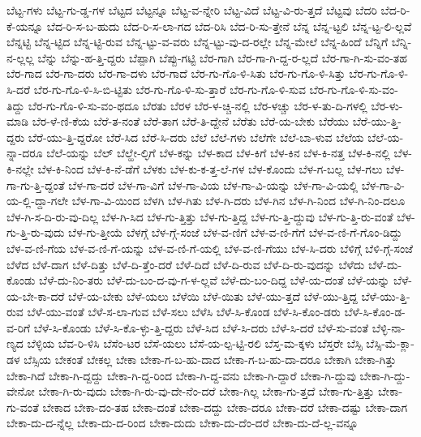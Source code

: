 {ಬೆಟ್ಟ-ಗಳು
ಬೆಟ್ಟ-ಗು-ಡ್ಡ-ಗಳ
ಬೆಟ್ಟದ
ಬೆಟ್ಟನ್ನೂ
ಬೆಟ್ಟ-ವ-ನ್ನೇರಿ
ಬೆಟ್ಟ-ವಿದೆ
ಬೆಟ್ಟ-ವಿ-ರು-ತ್ತದೆ
ಬೆಟ್ಟವು
ಬೆದರಿ
ಬೆದ-ರಿ-ಕೆ-ಯನ್ನೂ
ಬೆದ-ರಿ-ಸ-ಬ-ಹುದು
ಬೆದ-ರಿ-ಸ-ಲಾ-ಗದ
ಬೆದ-ರಿಸಿ
ಬೆದ-ರಿ-ಸು-ತ್ತೇನೆ
ಬೆನ್ನ
ಬೆನ್ನ-ಟ್ಟಲಿ
ಬೆನ್ನ-ಟ್ಟ-ಲಿ-ಲ್ಲವೆ
ಬೆನ್ನಟ್ಟಿ
ಬೆನ್ನ-ಟ್ಟಿದ
ಬೆನ್ನ-ಟ್ಟಿ-ರುವ
ಬೆನ್ನ-ಟ್ಟು-ವ-ವರು
ಬೆನ್ನ-ಟ್ಟು-ವು-ದ-ರಲ್ಲೇ
ಬೆನ್ನ-ಮೇಲೆ
ಬೆನ್ನ-ಹಿಂದೆ
ಬೆನ್ನಿಗೆ
ಬೆನ್ನಿ-ನ-ಲ್ಲಲ್ಲ
ಬೆನ್ನು
ಬೆನ್ನು-ಹ-ತ್ತಿ-ದ್ದರು
ಬೆಪ್ಪಾಗಿ
ಬೆಪ್ಪು-ಗಟ್ಟಿ
ಬೆರ-ಗಾಗಿ
ಬೆರ-ಗಾ-ಗಿ-ದ್ದ-ರ-ಲ್ಲದೆ
ಬೆರ-ಗಾ-ಗಿ-ಸು-ವಂ-ತಹ
ಬೆರ-ಗಾದ
ಬೆರ-ಗಾ-ದರು
ಬೆರ-ಗಾ-ದಳು
ಬೆರ-ಗಾದೆ
ಬೆರ-ಗು-ಗೊ-ಳಿ-ಸಿತು
ಬೆರ-ಗು-ಗೊ-ಳಿ-ಸಿತ್ತು
ಬೆರ-ಗು-ಗೊ-ಳಿ-ಸಿ-ದರೆ
ಬೆರ-ಗು-ಗೊ-ಳಿ-ಸಿ-ಬಿ-ಟ್ಟಿತು
ಬೆರ-ಗು-ಗೊ-ಳಿ-ಸು-ತ್ತಾರೆ
ಬೆರ-ಗು-ಗೊ-ಳಿ-ಸುವ
ಬೆರ-ಗು-ಗೊ-ಳಿ-ಸು-ವಂ-ತಿದ್ದು
ಬೆರ-ಗು-ಗೊ-ಳಿ-ಸು-ವಂ-ಥದೂ
ಬೆರತು
ಬೆರಳ
ಬೆರ-ಳ-ಚ್ಚಿ-ನಲ್ಲಿ
ಬೆರ-ಳಚ್ಚು
ಬೆರ-ಳ-ತು-ದಿ-ಗಳಲ್ಲಿ
ಬೆರ-ಳು-ಮಾಡಿ
ಬೆರ-ಳೆ-ಣಿ-ಕೆಯ
ಬೆರೆ-ತ-ನಂತೆ
ಬೆರೆ-ತಾಗ
ಬೆರೆ-ತಿ-ದ್ದೇನೆ
ಬೆರೆತು
ಬೆರೆ-ಯ-ಬೇಕು
ಬೆರೆಯು
ಬೆರೆ-ಯು-ತ್ತಿ-ದ್ದರು
ಬೆರೆ-ಯು-ತ್ತಿ-ದ್ದರೋ
ಬೆರೆ-ಸಿದ
ಬೆರೆ-ಸಿ-ದರು
ಬೆಲೆ
ಬೆಲೆ-ಗಳು
ಬೆಲೆಗೇ
ಬೆಲೆ-ಬಾ-ಳುವ
ಬೆಲೆಯ
ಬೆಲೆ-ಯ-ನ್ನಾ-ದರೂ
ಬೆಲೆ-ಯನ್ನು
ಬೆಲ್
ಬೆಲ್ಹೇ-ಲ್ಳಿಗೆ
ಬೆಳ-ಕನ್ನು
ಬೆಳ-ಕಾದ
ಬೆಳ-ಕಿಗೆ
ಬೆಳ-ಕಿನ
ಬೆಳ-ಕಿ-ನತ್ತ
ಬೆಳ-ಕಿ-ನಲ್ಲಿ
ಬೆಳ-ಕಿ-ನಲ್ಲೇ
ಬೆಳ-ಕಿ-ನಿಂದ
ಬೆಳ-ಕಿ-ನೆ-ಡೆಗೆ
ಬೆಳಕು
ಬೆಳ-ಕು-ಕ-ತ್ತ-ಲೆ-ಗಳ
ಬೆಳ-ಕೊಂದು
ಬೆಳ-ಗ-ಬಲ್ಲ
ಬೆಳ-ಗಲು
ಬೆಳ-ಗಾ-ಗು-ತ್ತಿ-ದ್ದಂತೆ
ಬೆಳ-ಗಾ-ದರೆ
ಬೆಳ-ಗಾ-ವಿಗೆ
ಬೆಳ-ಗಾ-ವಿಯ
ಬೆಳ-ಗಾ-ವಿ-ಯನ್ನು
ಬೆಳ-ಗಾ-ವಿ-ಯಲ್ಲಿ
ಬೆಳ-ಗಾ-ವಿ-ಯ-ಲ್ಲಿ-ದ್ದಾ-ಗಲೇ
ಬೆಳ-ಗಾ-ವಿ-ಯಿಂದ
ಬೆಳಗಿ
ಬೆಳ-ಗಿತು
ಬೆಳ-ಗಿ-ದರು
ಬೆಳ-ಗಿನ
ಬೆಳ-ಗಿ-ನಿಂದ
ಬೆಳ-ಗಿ-ನಿಂ-ದಲೂ
ಬೆಳ-ಗಿ-ಸ-ದಿ-ರು-ವು-ದಿಲ್ಲ
ಬೆಳ-ಗಿ-ಸಿದ
ಬೆಳ-ಗು-ತ್ತಿತ್ತು
ಬೆಳ-ಗು-ತ್ತಿದ್ದ
ಬೆಳ-ಗು-ತ್ತಿ-ದ್ದುವು
ಬೆಳ-ಗು-ತ್ತಿ-ರು-ವಂತೆ
ಬೆಳ-ಗು-ತ್ತಿ-ರು-ವುದು
ಬೆಳ-ಗು-ತ್ತೀಯೆ
ಬೆಳಗ್ಗೆ
ಬೆಳ-ಗ್ಗೆ-ಸಂಜೆ
ಬೆಳ-ವ-ಣಿಗೆ
ಬೆಳ-ವ-ಣಿ-ಗೆಗೆ
ಬೆಳ-ವ-ಣಿ-ಗೆ-ಗೊಂ-ಡಿದ್ದು
ಬೆಳ-ವ-ಣಿ-ಗೆಯ
ಬೆಳ-ವ-ಣಿ-ಗೆ-ಯನ್ನು
ಬೆಳ-ವ-ಣಿ-ಗೆ-ಯಲ್ಲಿ
ಬೆಳ-ವ-ಣಿ-ಗೆಯು
ಬೆಳ-ಸಿ-ದರು
ಬೆಳಿಗ್ಗೆ
ಬೆಳಿ-ಗ್ಗೆ-ಸಂಜೆ
ಬೆಳೆದ
ಬೆಳೆ-ದಾಗ
ಬೆಳೆ-ದಿತ್ತು
ಬೆಳೆ-ದಿ-ತ್ತೆಂ-ದರೆ
ಬೆಳೆ-ದಿದೆ
ಬೆಳೆ-ದಿ-ರುವ
ಬೆಳೆ-ದಿ-ರು-ವುದನ್ನು
ಬೆಳೆದು
ಬೆಳೆ-ದು-ಕೊಂಡು
ಬೆಳೆ-ದು-ನಿಂ-ತರು
ಬೆಳೆ-ದು-ಬಂ-ದ-ವು-ಗ-ಳ-ಲ್ಲವೆ
ಬೆಳೆ-ದು-ಬಂ-ದಿದ್ದ
ಬೆಳೆ-ಯ-ದಂತೆ
ಬೆಳೆ-ಯನ್ನು
ಬೆಳೆ-ಯ-ಬೇ-ಕಾ-ದರೆ
ಬೆಳೆ-ಯ-ಬೇಕು
ಬೆಳೆ-ಯಲು
ಬೆಳೆಯಿ
ಬೆಳೆ-ಯಿತು
ಬೆಳೆ-ಯು-ತ್ತದೆ
ಬೆಳೆ-ಯು-ತ್ತಿದ್ದ
ಬೆಳೆ-ಯು-ತ್ತಿ-ರುವ
ಬೆಳೆ-ಯು-ವಂತೆ
ಬೆಳೆ-ಸ-ಲಾ-ಗುವ
ಬೆಳೆ-ಸಲು
ಬೆಳೆಸಿ
ಬೆಳೆ-ಸಿ-ಕೊಂಡ
ಬೆಳೆ-ಸಿ-ಕೊಂ-ಡರು
ಬೆಳೆ-ಸಿ-ಕೊಂ-ಡ-ವ-ರಿಗೆ
ಬೆಳೆ-ಸಿ-ಕೊಂಡು
ಬೆಳೆ-ಸಿ-ಕೊ-ಳ್ಳು-ತ್ತಿ-ದ್ದರು
ಬೆಳೆ-ಸಿದ
ಬೆಳೆ-ಸಿ-ದರು
ಬೆಳೆ-ಸಿ-ದರೆ
ಬೆಳೆ-ಸು-ವಂತೆ
ಬೆಳ್ಳಿ-ನಾ-ಣ್ಯದ
ಬೆಳ್ಳಿಯ
ಬೆವ-ರಿ-ಳಿಸಿ
ಬೆಸೆಂ-ಟರ
ಬೆಸೆ-ಯಲು
ಬೆಸೆ-ಯ-ಲ್ಪ-ಟ್ಟಿ-ರಲಿ
ಬೆಸ್ತ-ಮ-ಕ್ಕಳು
ಬೆಸ್ತರೇ
ಬೆಸ್ಸಿ
ಬೆಸ್ಸಿ-ಮೆ-ಕ್ಲಾ-ಡಳ
ಬೆಸ್ಸಿಯ
ಬೇಕಂತೆ
ಬೇಕಲ್ಲ
ಬೇಕಾ
ಬೇಕಾ-ಗ-ಬ-ಹು-ದಾದ
ಬೇಕಾ-ಗ-ಬ-ಹು-ದಾ-ದರೂ
ಬೇಕಾಗಿ
ಬೇಕಾ-ಗಿತ್ತು
ಬೇಕಾ-ಗಿದೆ
ಬೇಕಾ-ಗಿ-ದ್ದದ್ದು
ಬೇಕಾ-ಗಿ-ದ್ದ-ರಿಂದ
ಬೇಕಾ-ಗಿ-ದ್ದ-ವನು
ಬೇಕಾ-ಗಿ-ದ್ದಾರೆ
ಬೇಕಾ-ಗಿ-ದ್ದುವು
ಬೇಕಾ-ಗಿ-ದ್ದು-ವೇನೋ
ಬೇಕಾ-ಗಿ-ರು-ವುದು
ಬೇಕಾ-ಗಿ-ರು-ವು-ದೇ-ನೆಂ-ದರೆ
ಬೇಕಾ-ಗಿಲ್ಲ
ಬೇಕಾ-ಗು-ತ್ತದೆ
ಬೇಕಾ-ಗು-ತ್ತಿತ್ತು
ಬೇಕಾ-ಗು-ವಂತೆ
ಬೇಕಾದ
ಬೇಕಾ-ದಂ-ತಹ
ಬೇಕಾ-ದಂತೆ
ಬೇಕಾ-ದದ್ದು
ಬೇಕಾ-ದರೂ
ಬೇಕಾ-ದರೆ
ಬೇಕಾ-ದಷ್ಟು
ಬೇಕಾ-ದಾಗ
ಬೇಕಾ-ದು-ದ-ನ್ನೆಲ್ಲ
ಬೇಕಾ-ದು-ದ-ರಿಂದ
ಬೇಕಾ-ದುದು
ಬೇಕಾ-ದು-ದೆಂ-ದರೆ
ಬೇಕಾ-ದು-ದೆ-ಲ್ಲ-ವನ್ನೂ
}
